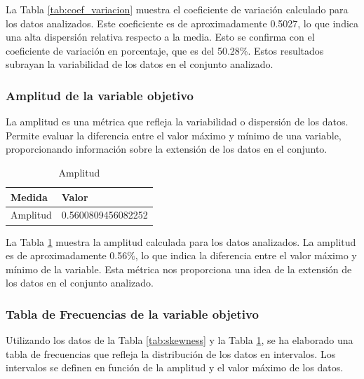 La Tabla \ref{tab:coef_variacion} muestra el coeficiente de variación calculado para los datos analizados. Este coeficiente es de aproximadamente 0.5027, lo que indica una alta dispersión relativa respecto a la media. Esto se confirma con el coeficiente de variación en porcentaje, que es del 50.28\%. Estos resultados subrayan la variabilidad de los datos en el conjunto analizado.

\subsubsection{Amplitud de la variable objetivo}

La amplitud es una métrica que refleja la variabilidad o dispersión de los datos. Permite evaluar la diferencia entre el valor máximo y mínimo de una variable, proporcionando información sobre la extensión de los datos en el conjunto.

\begin{table}[H]
    \centering
    \caption{Amplitud}
    \begin{tabular}{ll}
        \hline
        \textbf{Medida} & \textbf{Valor}     \\
        \hline
        Amplitud        & 0.5600809456082252 \\
        \hline
    \end{tabular}%
    \label{tab:amplitud}%
\end{table}%

La Tabla \ref{tab:amplitud} muestra la amplitud calculada para los datos analizados. La amplitud es de aproximadamente 0.56\%, lo que indica la diferencia entre el valor máximo y mínimo de la variable. Esta métrica nos proporciona una idea de la extensión de los datos en el conjunto analizado.

\subsubsection{Tabla de Frecuencias de la variable objetivo}

Utilizando los datos de la Tabla \ref{tab:skewness} y la Tabla \ref{tab:amplitud}, se ha elaborado una tabla de frecuencias que refleja la distribución de los datos en intervalos. Los intervalos se definen en función de la amplitud y el valor máximo de los datos.

